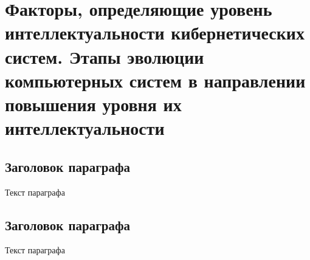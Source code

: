 \chapter{Факторы, определяющие уровень интеллектуальности кибернетических систем. Этапы эволюции компьютерных систем в направлении повышения уровня их интеллектуальности}
\label{chapter_intro}


\section{Заголовок параграфа}
\label{sec:1}
Текст параграфа

\section{Заголовок параграфа}
\label{sec:2}
Текст параграфа

%